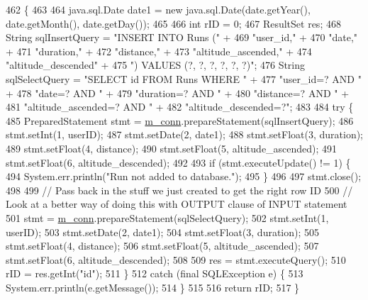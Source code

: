 \begin{DoxyCode}
462                                                                                      \{
463 
464         java.sql.Date date1 = \textcolor{keyword}{new} java.sql.Date(date.getYear(), date.getMonth(), date.getDay());
465 
466         \textcolor{keywordtype}{int} rID = 0;
467         ResultSet res;
468         String sqlInsertQuery = \textcolor{stringliteral}{"INSERT INTO Runs ("} +
469                 \textcolor{stringliteral}{"user\_id,"} +
470                 \textcolor{stringliteral}{"date,"} +
471                 \textcolor{stringliteral}{"duration,"} +
472                 \textcolor{stringliteral}{"distance,"} +
473                 \textcolor{stringliteral}{"altitude\_ascended,"} +
474                 \textcolor{stringliteral}{"altitude\_descended"} +
475                 \textcolor{stringliteral}{") VALUES (?, ?, ?, ?, ?, ?)"};
476         String sqlSelectQuery = \textcolor{stringliteral}{"SELECT id FROM Runs WHERE "} +
477                 \textcolor{stringliteral}{"user\_id=? AND "} +
478                 \textcolor{stringliteral}{"date=? AND "} +
479                 \textcolor{stringliteral}{"duration=? AND "} +
480                 \textcolor{stringliteral}{"distance=? AND "} +
481                 \textcolor{stringliteral}{"altitude\_ascended=? AND "} +
482                 \textcolor{stringliteral}{"altitude\_descended=?"};
483 
484         \textcolor{keywordflow}{try} \{
485             PreparedStatement stmt = \mbox{\hyperlink{classcom_1_1activitytracker_1_1_d_b_manager_a064088d13ac09eb147fdc19268771521}{m\_conn}}.prepareStatement(sqlInsertQuery);
486             stmt.setInt(1, userID);
487             stmt.setDate(2, date1);
488             stmt.setFloat(3, duration);
489             stmt.setFloat(4, distance);
490             stmt.setFloat(5, altitude\_ascended);
491             stmt.setFloat(6, altitude\_descended);
492 
493             \textcolor{keywordflow}{if} (stmt.executeUpdate() != 1) \{
494                 System.err.println(\textcolor{stringliteral}{"Run not added to database."});
495             \}
496 
497             stmt.close();
498 
499             \textcolor{comment}{// Pass back in the stuff we just created to get the right row ID}
500             \textcolor{comment}{// Look at a better way of doing this with OUTPUT clause of INPUT statement}
501             stmt = \mbox{\hyperlink{classcom_1_1activitytracker_1_1_d_b_manager_a064088d13ac09eb147fdc19268771521}{m\_conn}}.prepareStatement(sqlSelectQuery);
502             stmt.setInt(1, userID);
503             stmt.setDate(2, date1);
504             stmt.setFloat(3, duration);
505             stmt.setFloat(4, distance);
506             stmt.setFloat(5, altitude\_ascended);
507             stmt.setFloat(6, altitude\_descended);
508 
509             res = stmt.executeQuery();
510             rID = res.getInt(\textcolor{stringliteral}{"id"});
511         \}
512         \textcolor{keywordflow}{catch} (\textcolor{keyword}{final} SQLException e) \{
513             System.err.println(e.getMessage());
514         \}
515 
516         \textcolor{keywordflow}{return} rID;
517     \}
\end{DoxyCode}
